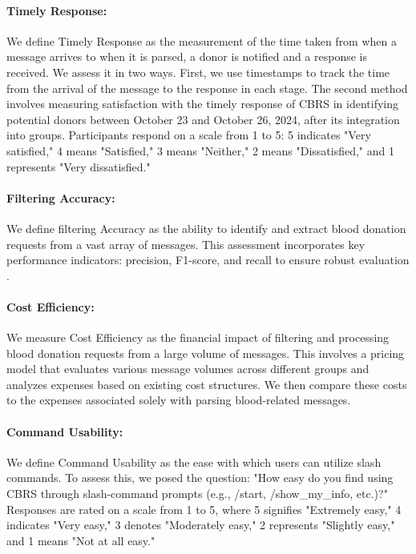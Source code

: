 \documentclass[11pt]{article}
\begin{document}
\paragraph{Timely Response:}
We define Timely Response as the measurement of the time taken from when a message arrives to when it is parsed, a donor is notified and a response is received. We assess it in two ways. First, we use timestamps to track the time from the arrival of the message to the response in each stage. The second method involves measuring satisfaction with the timely response of CBRS in identifying potential donors between October 23 and October 26, 2024, after its integration into groups. Participants respond on a scale from 1 to 5: 5 indicates "Very satisfied," 4 means "Satisfied," 3 means "Neither," 2 means "Dissatisfied," and 1 represents "Very dissatisfied."

\paragraph{Filtering Accuracy:}
We define filtering Accuracy as the ability to identify and extract blood donation requests from a vast array of messages. This assessment incorporates key performance indicators: precision, F1-score, and recall to ensure robust evaluation \cite{45yacouby2020probabilistic}.
\paragraph{Cost Efficiency:}
We measure Cost Efficiency as the financial impact of filtering and processing blood donation requests from a large volume of messages. This involves a pricing model that evaluates various message volumes across different groups and analyzes expenses based on existing cost structures. We then compare these costs to the expenses associated solely with parsing blood-related messages.

\paragraph{Command Usability:}
We define Command Usability as the ease with which users can utilize slash commands. To assess this, we posed the question: "How easy do you find using CBRS through slash-command prompts (e.g., /start, /show\_my\_info, etc.)?" Responses are rated on a scale from 1 to 5, where 5 signifies "Extremely easy," 4 indicates "Very easy," 3 denotes "Moderately easy," 2 represents "Slightly easy," and 1 means "Not at all easy."
\end{document}
